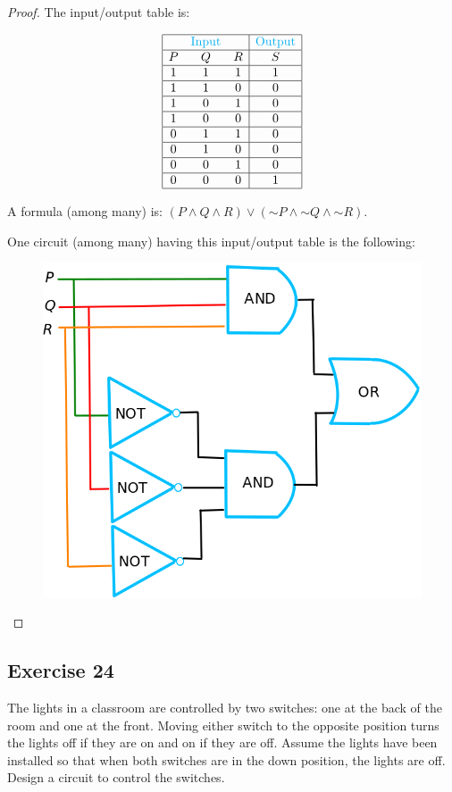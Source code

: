 \documentclass[14pt]{extarticle}
\begin{document}
\begin{proof}
The input/output table is:

$$
\begin{array}{|ccc|c|}
\hline
& \color{cyan}\text{Input} & & \color{cyan}\text{Output} \\
\hline
P&Q&R&S\\
\hline
1&1&1&1\\
\hline
1&1&0&0\\
\hline
1&0&1&0\\
\hline
1&0&0&0\\
\hline
0&1&1&0\\
\hline
0&1&0&0\\
\hline
0&0&1&0\\
\hline
0&0&0&1\\
\hline
\end{array}
$$

A formula (among many) is: $(P \wedge Q \wedge R) \vee ({\sim P} \wedge {\sim Q} \wedge {\sim R})$.

One circuit (among many) having this input/output table is the following:

\begin{figure}[ht!]
\centering
\includegraphics[scale=0.3]{../images/2.4.23.png}
\end{figure}
\end{proof}

\subsection{Exercise 24}
The lights in a classroom are controlled by two switches: one at the back of the room and one at the front. Moving either switch to the opposite position turns the lights off if they are on and on if they are off. Assume the lights have been installed so that when both switches are in the down position, the lights are off. Design a circuit to control the switches.
\end{document}
